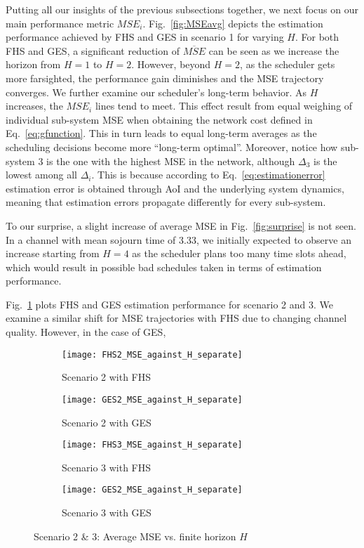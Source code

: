 Putting all our insights of the previous subsections together, we next focus on
our main performance metric $MSE_i$. Fig.~\ref{fig:MSEavg} depicts the
estimation performance achieved by FHS and GES in scenario 1 for varying $H$.
For both FHS and GES, a significant reduction of $\overline{MSE}$ can be seen as
we increase the horizon from $H=1$ to $H=2$. However, beyond $H=2$, as the
scheduler gets more farsighted, the performance gain diminishes and the MSE
trajectory converges. We further examine our scheduler's long-term behavior. As
$H$ increases, the $MSE_i$ lines tend to meet. This effect result from equal
weighing of individual sub-system MSE when obtaining the network cost defined in
Eq.~\eqref{eq:gfunction}. This in turn leads to equal long-term averages as the
scheduling decisions become more ``long-term optimal''. Moreover, notice how
sub-system 3 is the one with the highest MSE in the network, although $\Delta_3$
is the lowest among all $\Delta_i$. This is because according to
Eq.~\ref{eq:estimationerror} estimation error is obtained through AoI and the
underlying system dynamics, meaning that estimation errors propagate differently
for every sub-system.

To our surprise, a slight increase of average MSE in Fig.~\ref{fig:surprise} is
not seen. In a channel with mean sojourn time of 3.33, we initially expected to
observe an increase starting from $H=4$ as the scheduler plans too many time
slots ahead, which would result in possible bad schedules taken in terms of
estimation performance.

Fig.~\ref{fig:MSEavg2} plots FHS and GES estimation performance for scenario 2
and 3. We examine a similar shift for MSE trajectories with FHS due to changing
channel quality. However, in the case of GES, 


\begin{figure}[htb]
  \centering
  \begin{subfigure}[b]{0.49\textwidth}
    \centering
    \texttt{[image: FHS2\_MSE\_against\_H\_separate]}
    \caption{Scenario 2 with FHS}
  \end{subfigure}
  \hfill
  \begin{subfigure}[b]{0.49\textwidth}
    \centering
    \texttt{[image: GES2\_MSE\_against\_H\_separate]}
    \caption{Scenario 2 with GES}
  \end{subfigure}
  \begin{subfigure}[b]{0.49\textwidth}
    \centering
    \texttt{[image: FHS3\_MSE\_against\_H\_separate]}
    \caption{Scenario 3 with FHS}
  \end{subfigure}
  \hfill
  \begin{subfigure}[b]{0.49\textwidth}
    \centering
    \texttt{[image: GES2\_MSE\_against\_H\_separate]}
    \caption{Scenario 3 with GES}
  \end{subfigure}
  \caption{Scenario 2 \& 3: Average MSE vs. finite horizon $H$}
  \label{fig:MSEavg2}
\end{figure}

